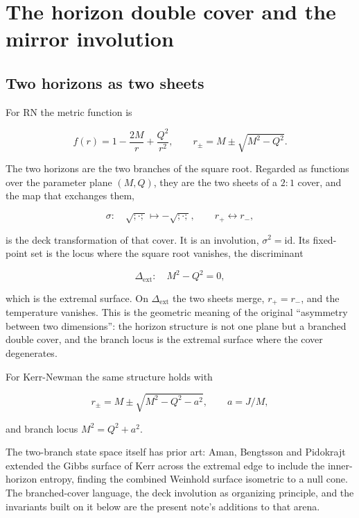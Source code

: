 \documentclass[11pt]{article}
\begin{document}
\section{The horizon double cover and the mirror involution}

\subsection{Two horizons as two sheets}

For RN the metric function is

\begin{equation*}
f(r) = 1 - \frac{2M}{r} + \frac{Q^2}{r^2}, \qquad
r_\pm = M \pm \sqrt{M^2 - Q^2}.
\tag{3.1}
\end{equation*}

The two horizons are the two branches of the square root. Regarded as functions over the parameter plane $(M,Q)$, they are the two sheets of a $2{:}1$ cover, and the map that exchanges them,

\begin{equation*}
\sigma : \quad \sqrt{;\cdot;} \mapsto -\sqrt{;\cdot;}, \qquad r_+ \leftrightarrow r_- ,
\tag{3.2}
\end{equation*}

is the deck transformation of that cover. It is an involution, $\sigma^2 = \mathrm{id}$. Its fixed-point set is the locus where the square root vanishes, the discriminant

\begin{equation*}
\Delta_{\mathrm{ext}} : \quad M^2 - Q^2 = 0 ,
\tag{3.3}
\end{equation*}

which is the extremal surface. On $\Delta_{\mathrm{ext}}$ the two sheets merge, $r_+ = r_-$, and the temperature vanishes. This is the geometric meaning of the original ``asymmetry between two dimensions'': the horizon structure is not one plane but a branched double cover, and the branch locus is the extremal surface where the cover degenerates.

For Kerr-Newman the same structure holds with

\begin{equation*}
r_\pm = M \pm \sqrt{M^2 - Q^2 - a^2}, \qquad a = J/M ,
\tag{3.4}
\end{equation*}

and branch locus $M^2 = Q^2 + a^2$.

The two-branch state space itself has prior art: Aman, Bengtsson and Pidokrajt extended the Gibbs surface of Kerr across the extremal edge to include the inner-horizon entropy, finding the combined Weinhold surface isometric to a null cone. The branched-cover language, the deck involution as organizing principle, and the invariants built on it below are the present note's additions to that arena.
\end{document}
